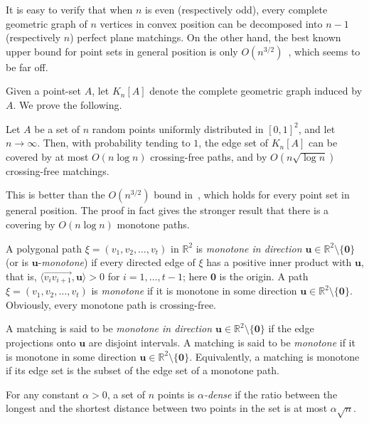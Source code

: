 \documentclass[a4paper,USenglish]{lipics-v2021}
\begin{document}
It is easy to verify that when $n$ is even (respectively odd), every complete
geometric graph of $n$ vertices in convex position 
can be decomposed into $n-1$ (respectively $n$) perfect plane matchings.
On the other hand, the best known upper bound for point sets in general position is only
$O(n^{3/2})$~\cite{ADH+05}, which seems to be far off.


Given a point-set $A$, let $K_n[A]$ denote the complete geometric graph induced by $A$.
We prove the following.


\begin{theorem} \label{thm:random}
  Let $A$ be a set of $n$ random points uniformly distributed in $[0,1]^2$, and let $n\rightarrow\infty$.  
  Then, with probability tending to $1$, the edge set of $K_n[A]$ can be covered by at most
  $O(n\log n)$ crossing-free paths, and by $O(n\sqrt{\log n})$ crossing-free matchings. 
\end{theorem}

This is better than the $O(n^{3/2})$ bound in~\cite{ADH+05},
which holds for every point set in general position.  The proof in fact gives the stronger result 
that there is a covering by $O(n\log n)$ monotone paths.



\begin{definition}
A polygonal path $\xi=(v_1,v_2,\ldots, v_t)$ in $\mathbb{R}^2$ is
\emph{monotone in direction $\mathbf{u}\in \mathbb{R}^2\setminus \{\mathbf{0}\}$}
(or is $\mathbf{u}$-\emph{monotone})
if every directed edge of $\xi$ has a positive inner product with $\mathbf{u}$, that is,
$\langle \overrightarrow{v_iv_{i+1}},\mathbf{u}\rangle>0$ for $i=1,\ldots, t-1$;
here $\mathbf{0}$ is the origin.
A path $\xi=(v_1,v_2,\ldots, v_t)$ is \emph{monotone}
if it is monotone in some direction $\mathbf{u}\in \mathbb{R}^2\setminus \{\mathbf{0}\}$. 
Obviously, every monotone path is crossing-free.

A matching is said to be \emph{monotone in direction $\mathbf{u}\in \mathbb{R}^2\setminus \{\mathbf{0}\}$}
if the edge projections onto $\mathbf{u}$ are disjoint intervals.
A matching is said to be \emph{monotone}
if it is monotone in some direction $\mathbf{u}\in \mathbb{R}^2\setminus \{\mathbf{0}\}$.
Equivalently, a matching is monotone if its edge set is the subset of the edge set of a monotone path. 


For any constant $\alpha>0$, a set of $n$ points is \emph{$\alpha$-dense} if the ratio
between the longest and the shortest distance between two points in the set is at most $\alpha \sqrt{n}$.
\end{definition}
\end{document}

